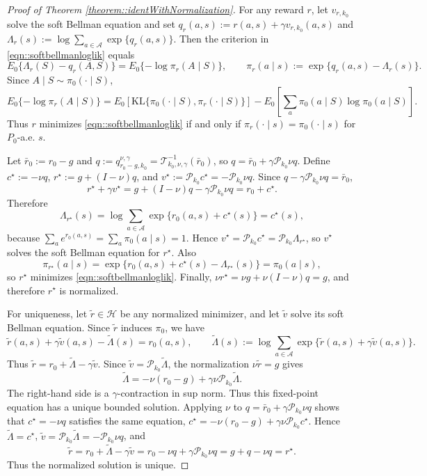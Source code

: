 \documentclass[11pt]{article}
\theoremstyle{plain}
\begin{document}
\begin{proof}[Proof of Theorem \ref{theorem::identWithNormalization}]
For any reward \(r\), let \(v_{r,k_0}\) solve the soft Bellman equation and set
\(q_r(a,s):=r(a,s)+\gamma v_{r,k_0}(a,s)\) and
\(\Lambda_r(s):=\log\sum_{a\in\mathcal A}\exp\{q_r(a,s)\}\). Then the criterion in
\eqref{eqn::softbellmanloglik} equals
\[
E_0\{\Lambda_r(S)-q_r(A,S)\}
=
E_0\{-\log \pi_r(A\mid S)\},
\qquad
\pi_r(a\mid s):=\exp\{q_r(a,s)-\Lambda_r(s)\}.
\]
Since \(A\mid S\sim\pi_0(\cdot\mid S)\),
\[
E_0\{-\log \pi_r(A\mid S)\}
=
E_0\!\left[\mathrm{KL}\{\pi_0(\cdot\mid S),\pi_r(\cdot\mid S)\}\right]
-
E_0\!\left[\sum_a \pi_0(a\mid S)\log \pi_0(a\mid S)\right].
\]
Thus \(r\) minimizes \eqref{eqn::softbellmanloglik} if and only if
\(\pi_r(\cdot\mid s)=\pi_0(\cdot\mid s)\) for \(P_0\)-a.e. \(s\).

Let \(\bar r_0:=r_0-g\) and
\(q:=q_{r_0-g,k_0}^{\nu,\gamma}
=\mathcal T_{k_0,\nu,\gamma}^{-1}(\bar r_0)\), so
\(q=\bar r_0+\gamma\mathcal P_{k_0}\nu q\). Define
\(c^\star:=-\nu q\), \(r^\star:=g+(I-\nu)q\), and
\(v^\star:=\mathcal P_{k_0}c^\star=-\mathcal P_{k_0}\nu q\). Since
\(q-\gamma\mathcal P_{k_0}\nu q=\bar r_0\),
\[
r^\star+\gamma v^\star
=
g+(I-\nu)q-\gamma\mathcal P_{k_0}\nu q
=
r_0+c^\star .
\]
Therefore
\[
\Lambda_{r^\star}(s)
=
\log\sum_{a\in\mathcal A}\exp\{r_0(a,s)+c^\star(s)\}
=
c^\star(s),
\]
because \(\sum_a e^{r_0(a,s)}=\sum_a\pi_0(a\mid s)=1\). Hence
\(v^\star=\mathcal P_{k_0}c^\star=\mathcal P_{k_0}\Lambda_{r^\star}\), so
\(v^\star\) solves the soft Bellman equation for \(r^\star\). Also
\[
\pi_{r^\star}(a\mid s)
=
\exp\{r_0(a,s)+c^\star(s)-\Lambda_{r^\star}(s)\}
=
\pi_0(a\mid s),
\]
so \(r^\star\) minimizes \eqref{eqn::softbellmanloglik}. Finally,
\(\nu r^\star=\nu g+\nu(I-\nu)q=g\), and therefore \(r^\star\) is normalized.

For uniqueness, let \(\tilde r\in\mathcal H\) be any normalized minimizer, and
let \(\tilde v\) solve its soft Bellman equation. Since \(\tilde r\) induces
\(\pi_0\), we have
\[
\tilde r(a,s)+\gamma\tilde v(a,s)-\tilde\Lambda(s)=r_0(a,s),
\qquad
\tilde\Lambda(s):=\log\sum_{a\in\mathcal A}
\exp\{\tilde r(a,s)+\gamma\tilde v(a,s)\}.
\]
Thus \(\tilde r=r_0+\tilde\Lambda-\gamma\tilde v\). Since
\(\tilde v=\mathcal P_{k_0}\tilde\Lambda\), the normalization
\(\nu\tilde r=g\) gives
\[
\tilde\Lambda
=
-\nu(r_0-g)+\gamma\nu\mathcal P_{k_0}\tilde\Lambda .
\]
The right-hand side is a \(\gamma\)-contraction in sup norm. Thus this
fixed-point equation has a unique bounded solution. Applying \(\nu\) to
\(q=\bar r_0+\gamma\mathcal P_{k_0}\nu q\) shows that
\(c^\star=-\nu q\) satisfies the same equation,
\(c^\star=-\nu(r_0-g)+\gamma\nu\mathcal P_{k_0}c^\star\). Hence
\(\tilde\Lambda=c^\star\), \(\tilde v=\mathcal P_{k_0}\tilde\Lambda
=-\mathcal P_{k_0}\nu q\), and
\[
\tilde r
=
r_0+\tilde\Lambda-\gamma\tilde v
=
r_0-\nu q+\gamma\mathcal P_{k_0}\nu q
=
g+q-\nu q
=
r^\star .
\]
Thus the normalized solution is unique.


\end{proof}
\end{document}
